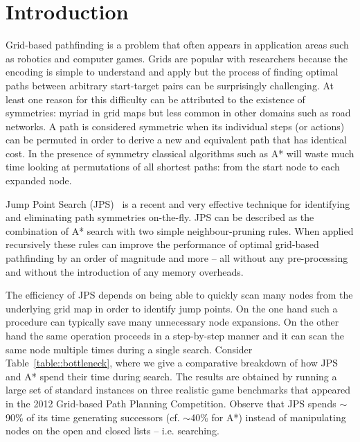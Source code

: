 \section{Introduction}
\label{sec::introduction}
Grid-based pathfinding is a problem that often
appears in application areas such as robotics and computer games. 
Grids are popular with researchers because the encoding is
simple to understand and apply but the process of finding optimal paths
between arbitrary start-target pairs can be surprisingly challenging. At least
one reason for this difficulty can be attributed to the existence of 
symmetries: myriad in grid maps but less common in other domains such as
road networks. A path is considered symmetric when its individual steps 
(or actions) can be permuted in order to derive a new and equivalent path
that has identical cost.
In the presence of symmetry classical algorithms such as A* will waste much 
time looking at permutations of all shortest paths: from the start node to each expanded node.

Jump Point Search (JPS)~\cite{harabor11b} is a recent and very effective 
technique for identifying and eliminating path symmetries on-the-fly. 
JPS can be described as the combination of A* search with two simple 
neighbour-pruning rules. When applied recursively these rules
can improve the performance of optimal grid-based pathfinding by an order of 
magnitude and more -- all without any pre-processing and without the 
introduction of any memory overheads.



The efficiency of JPS depends on being able to quickly scan many nodes
from the underlying grid map in order to identify jump points.
On the one hand such a procedure can typically save many unnecessary
node expansions. On the other hand the same operation proceeds in a 
step-by-step manner and it can scan the same node multiple times during 
a single search. 
Consider Table~\ref{table::bottleneck}, where we give a comparative
breakdown of how JPS and A{*} spend their time during search.
The results are obtained by running
a large set of standard instances on three realistic game benchmarks
that appeared in the 2012 Grid-based Path Planning Competition. Observe that
JPS spends $\sim$90\% of its time generating successors (cf. $\sim$40\% for
A{*}) instead of manipulating nodes on the open and closed lists -- i.e.
searching.

